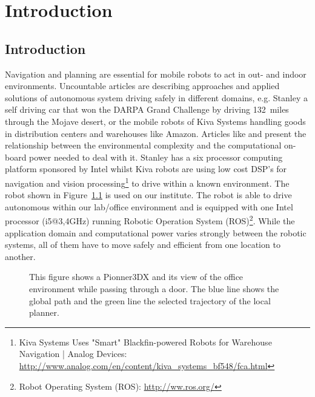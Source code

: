 \chapter{Introduction}\label{ch:introduction}
\section{Introduction}
Navigation and planning are essential for mobile robots to act in out- and indoor environments. 
Uncountable articles are describing approaches and applied solutions of autonomous system driving safely in different domains, e.g. Stanley \cite{stanley} a self driving car that won the DARPA Grand Challenge by driving 132~miles through the Mojave desert, or the mobile robots of Kiva Systems \cite{kiva} handling goods in distribution centers and warehouses like Amazon. 
Articles like \cite{stanley} and \cite{kiva} present the relationship between the environmental complexity and the computational on-board power needed to deal with it.
Stanley has a six processor computing platform sponsored by Intel whilst Kiva robots are using low cost DSP's for navigation and vision processing\footnote{Kiva Systems Uses "Smart" Blackfin-powered Robots for Warehouse Navigation | Analog Devices: \url{http://www.analog.com/en/content/kiva_systems_bf548/fca.html}} to drive within a known environment. 
The robot shown in Figure~\ref{fig:fig_pioneer} is used on our institute. The robot is able to drive autonomous within our lab/office environment and is equipped with one Intel processor (i5@3,4GHz) running Robotic Operation System (ROS)\footnote{Robot Operating System (ROS): \url{http://ww.ros.org/}}.  
While the application domain and computational power varies strongly between the robotic systems, all of them have to move safely and efficient from one location to another. 

   \begin{figure}[thpb]
      \centering
      \def\svgwidth{0.7\textwidth}
      
      \caption{This figure shows a Pionner3DX and its view of the office environment while passing through a door. The blue line shows the global path and the green line the selected trajectory of the local planner.}
      \label{fig:fig_pioneer}
   \end{figure}

